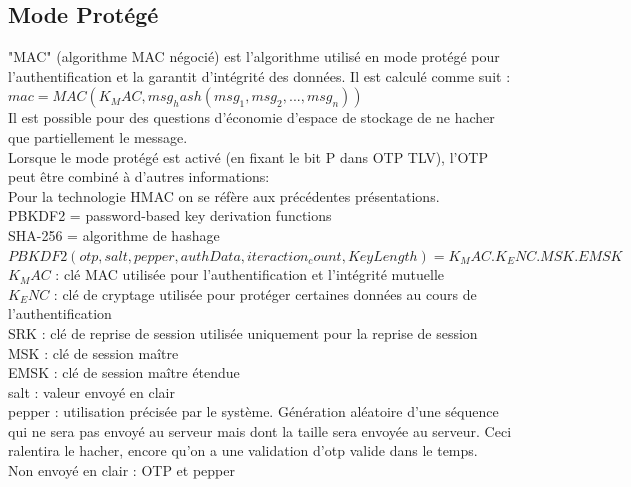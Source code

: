 \documentclass{article}
\begin{document}
\subsection{Mode Protégé}
"MAC" (algorithme MAC négocié) est l'algorithme utilisé en mode protégé pour l'authentification et la garantit d'intégrité des données.
Il est calculé comme suit : \\
$mac = MAC(K_MAC, msg_hash(msg_1, msg_2, ..., msg_n))$\\
Il est possible pour des questions d'économie d'espace de stockage de ne hacher que partiellement le message.\\


Lorsque le mode protégé est activé (en fixant le bit P dans OTP TLV), l'OTP peut être combiné à d'autres informations:\\

Pour la technologie HMAC on se réfère aux précédentes présentations.\\
PBKDF2 = password-based key derivation functions\\
SHA-256 = algorithme de hashage\\
$PBKDF2(otp,salt,pepper,authData,iteraction_count,Key Length) = K_MAC.K_ENC.MSK.EMSK$\\


$K_MAC$ : clé MAC utilisée pour l'authentification et l'intégrité mutuelle\\
$K_ENC$ : clé de cryptage utilisée pour protéger certaines données au cours de l'authentification\\
SRK : clé de reprise de session utilisée uniquement pour la reprise de session\\
MSK : clé de session maître\\
EMSK : clé de session maître étendue\\
salt : valeur envoyé en clair\\
pepper : utilisation précisée par le système. Génération aléatoire d'une séquence qui ne sera pas envoyé au serveur mais dont la taille sera envoyée au serveur. Ceci ralentira le hacher, encore qu'on a une validation d'otp valide dans le temps.\\

Non envoyé en clair : OTP et pepper
\end{document}
